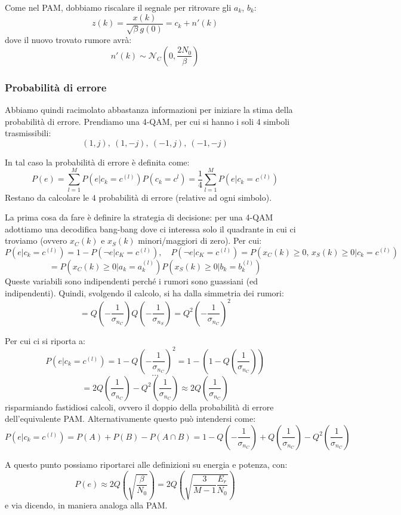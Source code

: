 \documentclass[a4paper,11pt]{article}
\begin{document}
Come nel PAM, dobbiamo riscalare il segnale per ritrovare gli $a_k$, $b_k$:
$$
z(k) = \frac{x(k)}{\sqrt{\beta} g(0)} = c_k + n'(k)
$$
dove il nuovo trovato rumore avrà:
$$
n'(k) \sim \mathcal{N}_C \left( 0, \frac{2 N_0}{\beta} \right)
$$

\subsubsection{Probabilità di errore}

Abbiamo quindi racimolato abbastanza informazioni per iniziare la stima della probabilità di errore. Prendiamo una 4-QAM, per cui si hanno i soli 4 simboli trasmissibili:
$$
(1, j), \ (1, -j), \ (-1, j), \ (-1, -j)
$$

In tal caso la probabilità di errore è definita come:
$$
P(e) = \sum_{l = 1}^M P(e | c_k = c^{(l)}) P(c_k = c^{l}) = \frac{1}{4} \sum_{l = 1}^M P(e | c_k = c^{(l)})
$$
Restano da calcolare le $4$ probabilità di errore (relative ad ogni simbolo).

La prima cosa da fare è definire la strategia di decisione: per una 4-QAM adottiamo una decodifica bang-bang dove ci interessa solo il quadrante in cui ci troviamo (ovvero $x_C(k)$ e $x_S(k)$ minori/maggiori di zero). Per cui:
$$
P(e | c_k = c^{(l)}) = 1 - P( \neg e | c_K = c^{(l)} ), \quad
P( \neg e |  c_K = c^{(l)} ) = P( x_C(k) \geq 0, \, x_S(k) \geq 0 | c_k = c^{(l)})
$$
$$
= P(x_C(k) \geq 0 | a_k = a_k^{(l)}) P(x_S(k) \geq 0 | b_k = b_k^{(l)})
$$
Queste variabili sono indipendenti perché i rumori sono guassiani (ed indipendenti).
Quindi, svolgendo il calcolo, si ha dalla simmetria dei rumori: 
$$
= Q\left( -\frac{1}{\sigma_{n_C}} \right) Q\left( -\frac{1}{\sigma_{n_S}} \right) = Q^2 \left( - \frac{1}{\sigma_{n_C}} \right)^2
$$

Per cui ci si riporta a: 
$$
P(e | c_k = c^{(l)}) = 1 - Q\left( -\frac{1}{\sigma_{n_C}} \right)^2 = 1 - \left( 1 - Q \left( \frac{1}{\sigma_{n_C}} \right) \right)
$$
$$
\dots
$$
$$
= 2 Q\left( \frac{1}{\sigma_{n_C}} \right) - Q^2 \left( \frac{1}{\sigma_{n_C}} \right) \approx 2 Q \left( \frac{1}{\sigma_{n_C}} \right)
$$
risparmiando fastidiosi calcoli, ovvero il doppio della probabilità di errore dell'equivalente PAM. Alternativamente questo può intendersi come:
$$
P(e | c_k = c^{(l)}) = P(A) + P(B) - P(A \cap B) = 1 - Q \left( - \frac{1}{\sigma_{n_C}} \right) + Q \left( \frac{1}{\sigma_{n_C}} \right) - Q^2 \left( \frac{1}{\sigma_{n_C}} \right)
$$

\par\smallskip

A questo punto possiamo riportarci alle definizioni su energia e potenza, con:
$$
P(e) \approx 2 Q \left( \sqrt{\frac{\beta}{N_0}} \right) = 2 Q \left( \sqrt{\frac{3}{M - 1}\frac{E_r}{N_0}} \right)
$$
e via dicendo, in maniera analoga alla PAM.
\end{document}
